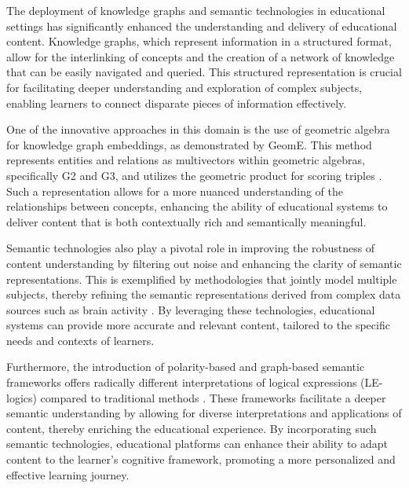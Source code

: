 The deployment of knowledge graphs and semantic technologies in educational settings has significantly enhanced the understanding and delivery of educational content. Knowledge graphs, which represent information in a structured format, allow for the interlinking of concepts and the creation of a network of knowledge that can be easily navigated and queried. This structured representation is crucial for facilitating deeper understanding and exploration of complex subjects, enabling learners to connect disparate pieces of information effectively.



One of the innovative approaches in this domain is the use of geometric algebra for knowledge graph embeddings, as demonstrated by GeomE. This method represents entities and relations as multivectors within geometric algebras, specifically G2 and G3, and utilizes the geometric product for scoring triples \cite{xu2021knowledgegraphembeddingsgeometric}. Such a representation allows for a more nuanced understanding of the relationships between concepts, enhancing the ability of educational systems to deliver content that is both contextually rich and semantically meaningful.



Semantic technologies also play a pivotal role in improving the robustness of content understanding by filtering out noise and enhancing the clarity of semantic representations. This is exemplified by methodologies that jointly model multiple subjects, thereby refining the semantic representations derived from complex data sources such as brain activity \cite{raposo2019lowdimensionalembodiedsemanticsmusic}. By leveraging these technologies, educational systems can provide more accurate and relevant content, tailored to the specific needs and contexts of learners.



Furthermore, the introduction of polarity-based and graph-based semantic frameworks offers radically different interpretations of logical expressions (LE-logics) compared to traditional methods \cite{conradie2021nondistributivelogicssemanticsmeaning}. These frameworks facilitate a deeper semantic understanding by allowing for diverse interpretations and applications of content, thereby enriching the educational experience. By incorporating such semantic technologies, educational platforms can enhance their ability to adapt content to the learner's cognitive framework, promoting a more personalized and effective learning journey.



